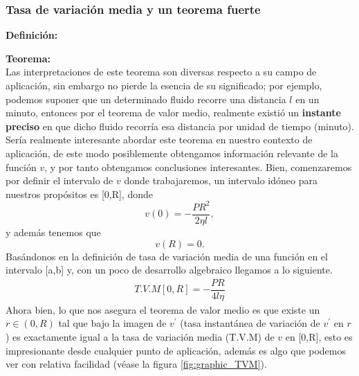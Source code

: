 \subsubsection{Tasa de variación media y un teorema fuerte}
\vspace{1.5cm}
\textbf{Definición: }\\
\vspace{0.5cm}

\textbf{Teorema: }\\
\vspace{0.5cm}
\clearpage
Las interpretaciones de este teorema son diversas respecto a su campo de aplicación, sin embargo no pierde la esencia de su significado; por ejemplo, podemos suponer que un determinado fluido recorre una distancia $l$ en un minuto, entonces por el teorema de valor medio, realmente existió un \textbf{instante preciso} en que dicho fluido recorría esa distancia por unidad de tiempo (minuto). Sería realmente interesante abordar este teorema en nuestro contexto de aplicación, de este modo posiblemente obtengamos información relevante de la función $v$, y por tanto obtengamos conclusiones interesantes. Bien, comenzaremos por definir el intervalo de $v$ donde trabajaremos, un intervalo idóneo para nuestros propósitos es [0,R], donde $$v(0)=-\frac{PR^{2}}{2\eta l},$$ y además tenemos que $$v(R)=0.$$ Basándonos en la definición de tasa de variación media de una función en el intervalo [a,b] y, con un poco de desarrollo algebraico llegamos a lo siguiente.
\begin{align}
    T.V.M[0,R]=-\dfrac{PR}{4l\eta}\label{TVM_F_EN_[AB]}
\end{align}
Ahora bien, lo que nos asegura el teorema de valor medio es que existe un $r\in(0,R)$ tal que bajo la imagen de $v^{'}$ (tasa instantánea de variación de $v^{'}$ en $r$) es exactamente igual a la tasa de variación media (T.V.M) de $v$ en [0,R], esto es impresionante desde cualquier punto de aplicación, además es algo que podemos ver con relativa facilidad (véase la figura \ref{fig:graphic_TVM}). 
\clearpage
